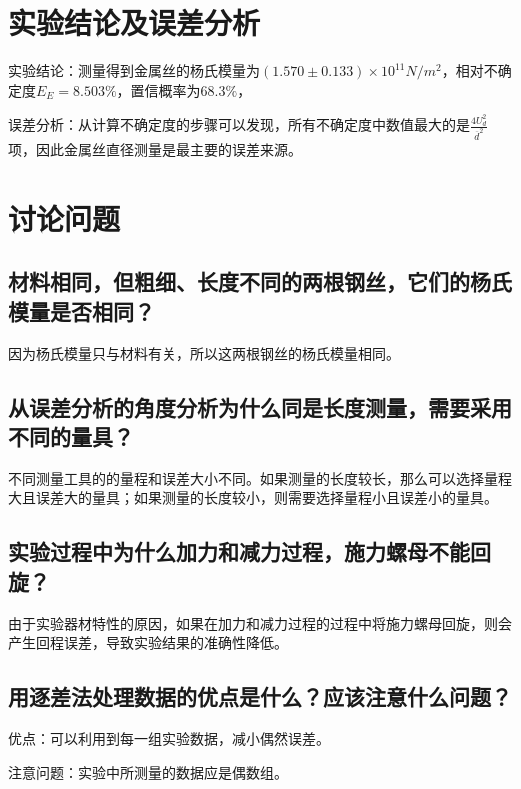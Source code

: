 \documentclass{ctexart}
\begin{document}
\section{实验结论及误差分析}
实验结论：测量得到金属丝的杨氏模量为$(1.570\pm0.133)\times10^{11} N/m^2 $，相对不确定度$E_E =8.503\%$，置信概率为$68.3\%$，

误差分析：从计算不确定度的步骤可以发现，所有不确定度中数值最大的是$\frac{4U_d^2}{\overline{d}^2}$项，因此金属丝直径测量是最主要的误差来源。
\section{讨论问题}

\subsection{材料相同，但粗细、长度不同的两根钢丝，它们的杨氏模量是否相同？}
因为杨氏模量只与材料有关，所以这两根钢丝的杨氏模量相同。
\subsection{从误差分析的角度分析为什么同是长度测量，需要采用不同的量具？}
不同测量工具的的量程和误差大小不同。如果测量的长度较长，那么可以选择量程大且误差大的量具；如果测量的长度较小，则需要选择量程小且误差小的量具。
\subsection{实验过程中为什么加力和减力过程，施力螺母不能回旋？}
由于实验器材特性的原因，如果在加力和减力过程的过程中将施力螺母回旋，则会产生回程误差，导致实验结果的准确性降低。

\subsection{用逐差法处理数据的优点是什么？应该注意什么问题？}
优点：可以利用到每一组实验数据，减小偶然误差。 

注意问题：实验中所测量的数据应是偶数组。
\end{document}
